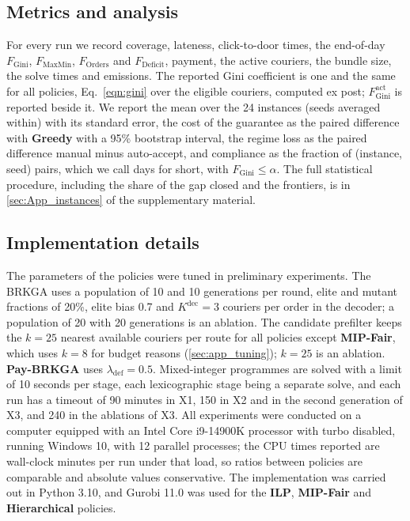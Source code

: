 \documentclass[a4paper,11pt,review,3p,authoryear]{elsarticle}
\newcommand{\FG}{F_{\text{Gini}}}
\newcommand{\FGa}{F_{\text{Gini}}^{\text{act}}}
\newcommand{\FD}{F_{\text{Deficit}}}
\newcommand{\FO}{F_{\text{Orders}}}
\newcommand{\FM}{F_{\text{MaxMin}}}
\begin{document}
\subsection{Metrics and analysis}
\label{sec:metrics}

For every run we record coverage, lateness, click-to-door times, the end-of-day $\FG$, $\FM$, $\FO$ and $\FD$, payment, the active couriers, the bundle size, the solve times and emissions. The reported Gini coefficient is one and the same for all policies, Eq.~\eqref{eqn:gini} over the eligible couriers, computed ex post; $\FGa$ is reported beside it. We report the mean over the 24 instances (seeds averaged within) with its standard error, the cost of the guarantee as the paired difference with \textbf{Greedy} with a 95\% bootstrap interval, the regime loss as the paired difference manual minus auto-accept, and compliance as the fraction of (instance, seed) pairs, which we call days for short, with $\FG \le \alpha$. The full statistical procedure, including the share of the gap closed and the frontiers, is in \ref{sec:App_instances} of the supplementary material.

\subsection{Implementation details}
\label{sec:implementation}

The parameters of the policies were tuned in preliminary experiments. The BRKGA uses a population of 10 and 10 generations per round, elite and mutant fractions of 20\%, elite bias 0.7 and $K^{\text{dec}} = 3$ couriers per order in the decoder; a population of 20 with 20 generations is an ablation. The candidate prefilter keeps the $k = 25$ nearest available couriers per route for all policies except \textbf{MIP-Fair}, which uses $k = 8$ for budget reasons (\ref{sec:app_tuning}); $k = 25$ is an ablation. \textbf{Pay-BRKGA} uses $\lambda_{\text{def}} = 0.5$. Mixed-integer programmes are solved with a limit of 10 seconds per stage, each lexicographic stage being a separate solve, and each run has a timeout of 90 minutes in X1, 150 in X2 and in the second generation of X3, and 240 in the ablations of X3. All experiments were conducted on a computer equipped with an Intel Core i9-14900K processor with turbo disabled, running Windows 10, with 12 parallel processes; the CPU times reported are wall-clock minutes per run under that load, so ratios between policies are comparable and absolute values conservative. The implementation was carried out in Python 3.10, and Gurobi 11.0 was used for the \textbf{ILP}, \textbf{MIP-Fair} and \textbf{Hierarchical} policies.
\end{document}
